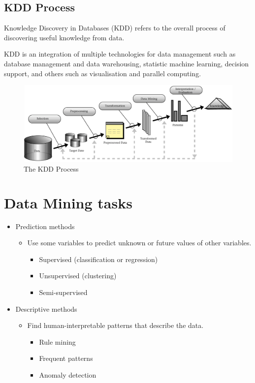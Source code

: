 \newpage
\subsection{KDD Process}
Knowledge Discovery in Databases (KDD) refers to the overall process of discovering useful knowledge from data.

KDD is an integration of multiple technologies for data management such as database management and data warehousing, 
statistic machine learning, decision support, and others such as visualisation and parallel computing. 

\begin{figure}[H]
    \centering
    \includegraphics[scale=0.2]{figures/kdd.png}
    \caption{The KDD Process}
\end{figure}

\section{Data Mining tasks}
\begin{itemize}
    \item Prediction methods
    \begin{itemize}
        \item Use some variables to predict unknown or future values of other variables.
        \begin{itemize}
            \item Supervised (classification or regression)
            \item Unsupervised (clustering)
            \item Semi-supervised
        \end{itemize}
    \end{itemize}
    \item Descriptive methods
    \begin{itemize}
        \item Find human-interpretable patterns that describe the data.
        \begin{itemize}
            \item Rule mining
            \item Frequent patterns
            \item Anomaly detection
        \end{itemize}
    \end{itemize}
\end{itemize}

